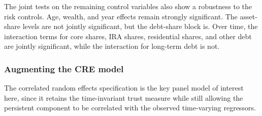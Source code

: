 \par The joint tests on the remaining control variables also show a robustness to the risk controls. Age, wealth, and year effects remain strongly significant. The asset-share levels are not jointly significant, but the debt-share block is. Over time, the interaction terms for core shares, IRA shares, residential shares, and other debt are jointly significant, while the interaction for long-term debt is not. 

\subsubsection{Augmenting the CRE model}

\par The correlated random effects specification is the key panel model of interest here, since it retains the time-invariant trust measure while still allowing the persistent component to be correlated with the observed time-varying regressors.

\begin{table}[htbp]
\centering
\caption{\textbf{The CRE (Mundlak) Model with Portfolio-Share Controls}}
\label{tab:41_cre_shares}
\begin{threeparttable}
\begingroup
\setlength{\tabcolsep}{2pt}%
\renewcommand{\arraystretch}{0.70}%
\scriptsize%
\resizebox{\textwidth}{!}{%
%
}%
\endgroup
\begin{tablenotes}[flushleft]
\scriptsize
\item {}%
\end{tablenotes}
\end{threeparttable}
\end{table}
\FloatBarrier

